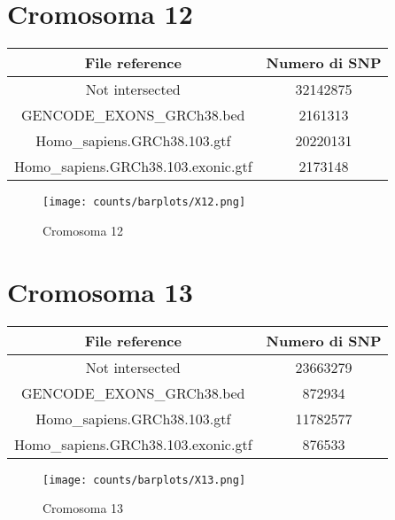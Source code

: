 \section*{Cromosoma 12}
  \begin{table}[H]\centering
	\begin{tabular}{|c|c|}
	  \hline
	  File reference & Numero di SNP \\
		\hline
		Not intersected & 32142875 \\
	  \hline
	  GENCODE\_EXONS\_GRCh38.bed & 2161313 \\
	  \hline
	  Homo\_sapiens.GRCh38.103.gtf & 20220131 \\
	  \hline
	  Homo\_sapiens.GRCh38.103.exonic.gtf & 2173148 \\
	  \hline
	\end{tabular}
  \end{table}
  \begin{figure}[H]
	\texttt{[image: counts/barplots/X12.png]}
	\caption{Cromosoma 12}
	\label{fig:chr12}
  \end{figure}

\section*{Cromosoma 13}
  \begin{table}[H]\centering
	\begin{tabular}{|c|c|}
	  \hline
	  File reference & Numero di SNP \\
		\hline
		Not intersected & 23663279 \\
	  \hline
	  GENCODE\_EXONS\_GRCh38.bed & 872934 \\
	  \hline
	  Homo\_sapiens.GRCh38.103.gtf & 11782577 \\
	  \hline
	  Homo\_sapiens.GRCh38.103.exonic.gtf & 876533 \\
	  \hline
	\end{tabular}
  \end{table}
  \begin{figure}[H]
	\texttt{[image: counts/barplots/X13.png]}
	\caption{Cromosoma 13}
	\label{fig:chr13}
  \end{figure}

